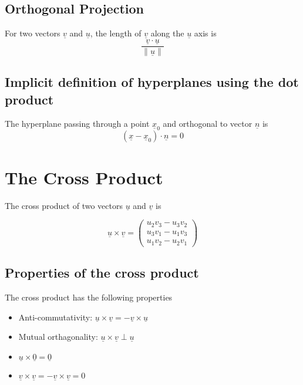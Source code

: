 \subsection{Orthogonal Projection}
\begin{framed}
For two vectors $ \underline{v}$ and $ \underline{u}$, the length of $ \underline{v}$ along the $ \underline{u}$ axis is 
   \[
      \frac{\underline{v} \cdot   \underline{u}}{ \lVert \underline{u} \rVert } 
   \] 
\end{framed}

\subsection{Implicit definition of hyperplanes using the dot product}
\begin{framed}
   The hyperplane passing through a point $\underline{x}_0$ and orthogonal to vector $\underline{n}$ is 
   \[
      \left( \underline{x} - \underline{x}_0 \right) \cdot \underline{n} = 0
   \] 
\end{framed}

\section{The Cross Product}
The cross product of two vectors $ \underline{u}$ and $ \underline{v}$ is 
\begin{framed}
  \[
    \underline{u} \times \underline{v} = 
      \begin{pmatrix}    
         u_2 v_3 - u_3 v_2 \\
         u_3 v_1 - u_1 v_3 \\
         u_1 v_2 - u_2 v_1
      \end{pmatrix}
  \] 
\end{framed}

\subsection{Properties of the cross product}
\begin{framed}
  The cross product has the following properties
  \begin{itemize}
     \item Anti-commutativity: $\underline{u} \times \underline{v} = - \underline{v} \times \underline{u}$
     \item Mutual orthagonality: $\underline{u} \times \underline{v} \perp \underline{u}$
     \item $\underline{u} \times \underline{0} = \underline{0}$
     \item $\underline{v} \times \underline{v} = - \underline{v} \times \underline{v} = 0$
  \end{itemize}
\end{framed}

